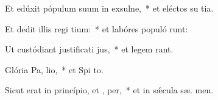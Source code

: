 \item Et edúxit pópulum suum in exsulne,~* et eléctos su  tia.
\item Et dedit illis regi tium:~* et labóres populó runt:
\item Ut custódiant justificati jus,~* et legem  rant.
\item Glória Pa,  lio,~* et Spi to.
\item Sicut erat in princípio, et ,  per,~* et in sǽcula sæ. men.

